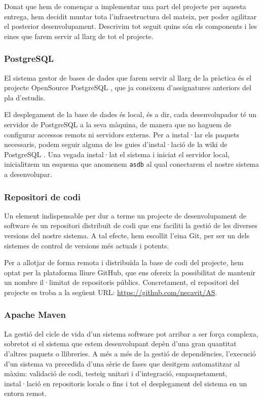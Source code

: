 Donat que hem de començar a implementar una part del projecte per aquesta entrega, hem decidit muntar tota l'infraestructura del mateix, per poder agilitzar el posterior desenvolupament. Descrivim tot seguit quins són els components i les eines que farem servir al llarg de tot el projecte.

\subsubsection{PostgreSQL}
El sistema gestor de bases de dades que farem servir al llarg de la pràctica és el projecte OpenSource PostgreSQL \cite{website:PostgreSQL}, que ja coneixem d'assignatures anteriors del pla d'estudis.

El desplegament de la base de dades és local, és a dir, cada desenvolupador té un servidor de PostgreSQL a la seva màquina, de manera que no haguem de configurar accessos remots ni servidors externs. Per a instal·lar els paquets necessaris, podem seguir alguna de les guies d'instal·lació de la wiki de PostgreSQL \cite{website:PostgreSQLInstallationGuide}. Una vegada instal·lat el sistema i iniciat el servidor local, inicialitzem un esquema que anomenem \texttt{asdb} al qual conectarem el nostre sistema a desenvolupar.

\subsubsection{Repositori de codi}
Un element indispensable per dur a terme un projecte de desenvolupament de software és un repositori distribuït de codi que ens faciliti la gestió de les diverses versions del nostre sistema. A tal efecte, hem escollit l'eina Git, per ser un dels sistemes de control de versions més actuals i potents.

Per a allotjar de forma remota i distribuïda la base de codi del projecte, hem optat per la plataforma lliure GitHub, que ens ofereix la possibilitat de mantenir un nombre il·limitat de repositoris públics. Concretament, el repositori del projecte es troba a la següent URL: \url{https://github.com/necavit/AS}.

\subsubsection{Apache Maven}
La gestió del cicle de vida d'un sistema software pot arribar a ser força complexa, sobretot si el sistema que estem desenvolupant depèn d'una gran quantitat d'altres paquets o llibreries. A més a més de la gestió de dependències, l'execució d'un sistema va precedida d'una sèrie de fases que desitgem automatitzar al màxim: validació de codi, testeig unitari i d'integració, empaquetament, instal·lació en repositoris locals o fins i tot el desplegament del sistema en un entorn remot.

